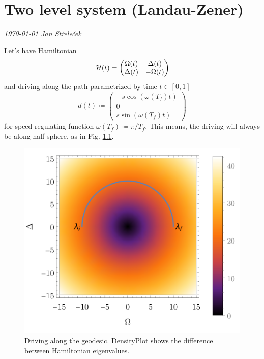 \chapter{Two level system (Landau-Zener)}
\textit{\today\newline
Jan Střeleček\newline}

Let's have Hamiltonian
\begin{equation}
    \mathcal{H}(t)=\begin{pmatrix}
        \Omega(t)&\Delta(t)\\
        \Delta(t)&-\Omega(t)
    \end{pmatrix}
\end{equation}
and driving along the path parametrized by time $t\in[0,1]$
\begin{equation}
    d(t)\coloneqq \begin{pmatrix}
        -s \cos(\omega(T_f)t)\\
        0\\
        s \sin(\omega(T_f)t)
    \end{pmatrix}
\end{equation}
for speed regulating function $\omega(T_f)\coloneqq \pi/T_f$. This means, the driving will always be along half-sphere, as in Fig. \ref{fig:driving}.

\begin{figure}[H]
    \centering
    \includegraphics[scale=1.2]{../img/driving.pdf}
    \caption{Driving along the geodesic. DensityPlot shows the difference between Hamiltonian eigenvalues.}
    \label{fig:driving}
\end{figure}

